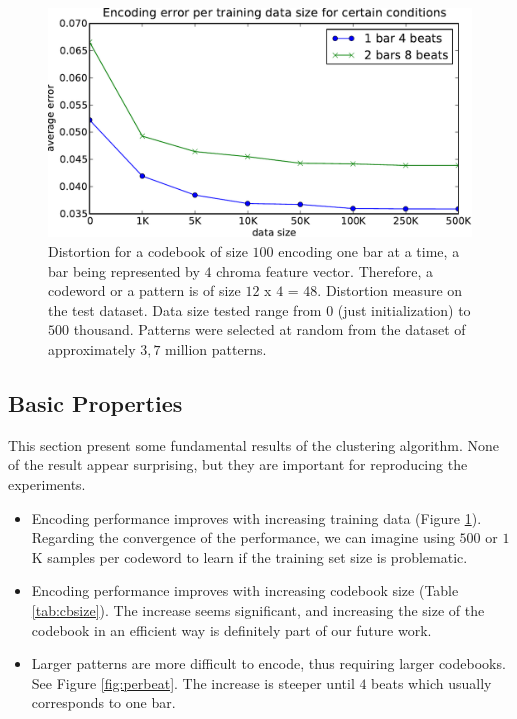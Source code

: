 \documentclass{article}
\begin{document}
\begin{figure}[htb]
\begin{center}
\includegraphics[width=.8\columnwidth]{data_sizes}
\end{center}
\caption{\small{Distortion for a codebook of size $100$ encoding one bar
at a time, a bar being represented by $4$ chroma feature vector.
Therefore, a codeword or a pattern is of size $12$ x $4$ = $48$.
Distortion measure on the test dataset. Data size tested range
from $0$ (just initialization) to $500$ thousand. Patterns were selected at
random from the dataset of approximately $3,7$ million patterns.
}}
\label{fig:data_sizes}
\end{figure}


\subsection{Basic Properties}
This section present some fundamental results of the clustering algorithm.
None of the result appear surprising,  but they are important for 
reproducing the experiments.
\begin{itemize}
\item Encoding performance improves with increasing training data (Figure
\ref{fig:data_sizes}). Regarding the convergence of the performance,
we can imagine using $500$ or $1$K samples per codeword to learn if the
training set size is problematic.
\item Encoding performance improves with increasing codebook size
(Table \ref{tab:cbsize}). The increase seems significant, and
increasing the size of the codebook in an efficient way
is definitely part of our future work.
\item Larger patterns are more difficult to encode, thus requiring
larger codebooks. See Figure \ref{fig:perbeat}. The increase is steeper
until $4$ beats which usually corresponds to one bar.
\end{itemize}
\end{document}
